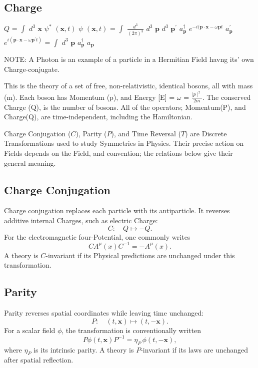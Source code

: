\documentclass[a4paper, 10pt, onepage]{elegantbook}
\begin{document}
{\subsection{Charge}

$Q$  
= $\int$ $d^{3}$ $\mathbf{\textbf{x}}$ $\psi^{*}$ $(\mathbf{\textbf{x}}, t)$ $\psi$ $(\mathbf{x}, t)$ 
= $\int$ $\frac{d^{3}}{(2 \pi)^3}$ $d^{3}$ $\mathbf{\textbf{p}}$ $d^{3}$ $\mathbf{\textbf{p}}^{\prime}$ 
$a^{\dagger}_\mathbf{\textbf{p}}$ $e^{-i(\mathbf{\textbf{p}}
\cdot \mathbf{\textbf{x}} - \omega \mathbf{\textbf{p}}t}$ $a_\mathbf{\textbf{p}}^{\prime}$ $e^{i(\mathbf{\textbf{p}} 
\cdot \mathbf{\textbf{x}} - \omega \mathbf{\textbf{p}}^{\prime}t)}$ 
= $\int$ $d^{3}$ $\mathbf{\textbf{p}}$ $a^{\dagger}_\mathbf{\textbf{p}}$ $a_\mathbf{\textbf{p}}$  

NOTE: A Photon is an example of a particle in a Hermitian Field havng its' own Charge-conjugate. 

This is the theory of a set of free, non-relativistic, identical bosons, all with mass (m). Each boson has Momentum 
(p), and Energy [E] = $\omega$ = $\frac{\mid p \mid^2}{2m}$. The conserved Charge (Q), is the number of bosons. All of 
the operators; Momentum(P), and Charge(Q), are time-independent, including the Hamiltonian. 


Charge Conjugation (\(C\)), Parity (\(P\)), and Time Reversal (\(T\)) are Discrete Transformations used to study 
Symmetries in Physics. Their precise action on Fields depends on the Field, and convention; the relations below give 
their general meaning.

\subsection{Charge Conjugation}

Charge conjugation replaces each particle with its antiparticle. It
reverses additive internal Charges, such as electric Charge:
\[
C:\quad Q\longmapsto -Q.
\]
For the electromagnetic four-Potential, one commonly writes
\[
C A^\mu(x) C^{-1}=-A^\mu(x).
\]
A theory is \(C\)-invariant if its Physical predictions are unchanged
under this transformation.

\subsection{Parity}

Parity reverses spatial coordinates while leaving time unchanged:
\[
P:\quad (t,\mathbf{x})\longmapsto(t,-\mathbf{x}).
\]
For a scalar field \(\phi\), the transformation is conventionally
written
\[
P\phi(t,\mathbf{x})P^{-1}
=\eta_P\,\phi(t,-\mathbf{x}),
\]
where \(\eta_P\) is its intrinsic parity. A theory is \(P\)-invariant
if its laws are unchanged after spatial reflection.

}
\end{document}
